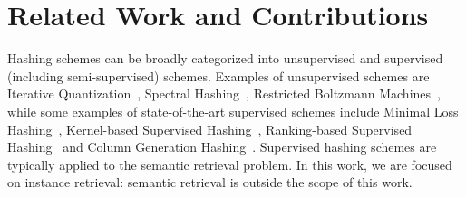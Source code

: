 \documentclass[10pt,twocolumn,letterpaper]{article}
\begin{document}
\section{Related Work and Contributions}

Hashing schemes can be broadly categorized into unsupervised and supervised (including semi-supervised) schemes. Examples of unsupervised schemes are Iterative Quantization~\cite{ITQ}, Spectral Hashing~\cite{SpectralHashing}, Restricted Boltzmann Machines~\cite{HintonRBM}, while some examples of state-of-the-art supervised schemes include Minimal Loss Hashing~\cite{MLH}, Kernel-based Supervised Hashing~\cite{KLSH}, Ranking-based Supervised Hashing~\cite{RSH} and Column Generation Hashing~\cite{CGH}.
Supervised hashing schemes are typically applied to the semantic retrieval problem. 
In this work, we are focused on instance retrieval: semantic retrieval is outside the scope of this work.
\end{document}

